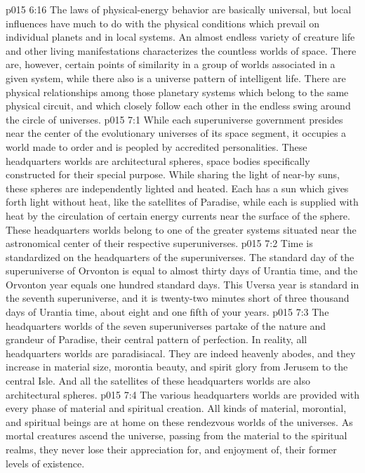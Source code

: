 \vs p015 6:16 The laws of physical\hyp{}energy behavior are basically universal, but local influences have much to do with the physical conditions which prevail on individual planets and in local systems. An almost endless variety of creature life and other living manifestations characterizes the countless worlds of space. There are, however, certain points of similarity in a group of worlds associated in a given system, while there also is a universe pattern of intelligent life. There are physical relationships among those planetary systems which belong to the same physical circuit, and which closely follow each other in the endless swing around the circle of universes.
\vs p015 7:1 While each superuniverse government presides near the center of the evolutionary universes of its space segment, it occupies a world made to order and is peopled by accredited personalities. These headquarters worlds are architectural spheres, space bodies specifically constructed for their special purpose. While sharing the light of near\hyp{}by suns, these spheres are independently lighted and heated. Each has a sun which gives forth light without heat, like the satellites of Paradise, while each is supplied with heat by the circulation of certain energy currents near the surface of the sphere. These headquarters worlds belong to one of the greater systems situated near the astronomical center of their respective superuniverses.
\vs p015 7:2 \pc Time is standardized on the headquarters of the superuniverses. The standard day of the superuniverse of Orvonton is equal to almost thirty days of Urantia time, and the Orvonton year equals one hundred standard days. This Uversa year is standard in the seventh superuniverse, and it is twenty\hyp{}two minutes short of three thousand days of Urantia time, about eight and one fifth of your years.
\vs p015 7:3 \pc The headquarters worlds of the seven superuniverses partake of the nature and grandeur of Paradise, their central pattern of perfection. In reality, all headquarters worlds are paradisiacal. They are indeed heavenly abodes, and they increase in material size, morontia beauty, and spirit glory from Jerusem to the central Isle. And all the satellites of these headquarters worlds are also architectural spheres.
\vs p015 7:4 The various headquarters worlds are provided with every phase of material and spiritual creation. All kinds of material, morontial, and spiritual beings are at home on these rendezvous worlds of the universes. As mortal creatures ascend the universe, passing from the material to the spiritual realms, they never lose their appreciation for, and enjoyment of, their former levels of existence.
